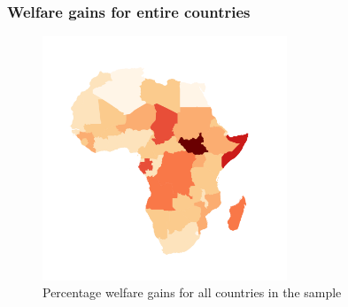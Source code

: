\documentclass[]{beamer}   	%
\begin{document}

\begin{frame}
\label{country_map}
\frametitle{Welfare gains for entire countries}
\begin{figure}
    \includegraphics[width=0.65\textwidth, trim={1cm 4cm 0cm 2cm},clip]{../../Analysis/output/zeta_heatmaps/African_countries_zeta.png}
    \caption{Percentage welfare gains for all countries in the sample}
  \end{figure}
\end{frame}
\end{document}
